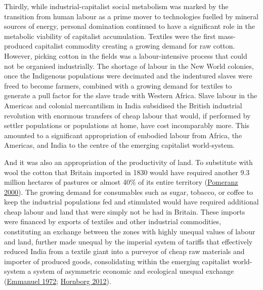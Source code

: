 \documentclass[a4paper, nobind]{templates/ociamthesis}
\begin{document}
Thirdly, while industrial-capitalist social metabolism was marked by the transition from human labour as a prime mover to technologies fuelled by mineral sources of energy, personal domination continued to have a significant role in the metabolic viability of capitalist accumulation. Textiles were the first mass-produced capitalist commodity creating a growing demand for raw cotton. However, picking cotton in the fields was a labour-intensive process that could not be organised industrially. The shortage of labour in the New World colonies, once the Indigenous populations were decimated and the indentured slaves were freed to become farmers, combined with a growing demand for textiles to generate a pull factor for the slave trade with Western Africa. Slave labour in the Americas and colonial mercantilism in India subsidised the British industrial revolution with enormous transfers of cheap labour that would, if performed by settler populations or populations at home, have cost incomparably more. This amounted to a significant appropriation of embodied labour from Africa, the Americas, and India to the centre of the emerging capitalist world-system.

And it was also an appropriation of the productivity of land. To substitute with wool the cotton that Britain imported in 1830 would have required another 9.3 million hectares of pastures or almost 40\% of its entire territory (\protect\hyperlink{ref-pomeranz_great_2000}{Pomeranz 2000}). The growing demand for consumables such as sugar, tobacco, or coffee to keep the industrial populations fed and stimulated would have required additional cheap labour and land that were simply not be had in Britain. These imports were financed by exports of textiles and other industrial commodities, constituting an exchange between the zones with highly unequal values of labour and land, further made unequal by the imperial system of tariffs that effectively reduced India from a textile giant into a purveyor of cheap raw materials and importer of produced goods, consolidating within the emerging capitalist world-system a system of asymmetric economic and ecological unequal exchange (\protect\hyperlink{ref-emmanuel_unequal_1972}{Emmanuel 1972}; \protect\hyperlink{ref-hornborg_global_2012}{Hornborg 2012}).
\end{document}
